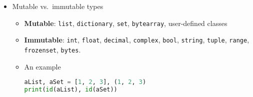 \documentclass[a4paper,12pt,%
              final%
              ]{article}
\begin{document}
\begin{itemize}
\begin{itemize}
        \begin{itemize}
          \item \verb|"Hi, {0}! It's {1}".format('Bob','Alice')| (or \verb|{<n>:s}| for instance))
          \item \verb|"Hi, {v1}! It's {v2}".format(v1='Bob',v2='Alice')| (or \verb|{<var>:s}| for instance)
          \item \verb|d={'v1':'Bob','v2':'Alice'}; "Hi, {v1}! It's {v2}".format_map(d)| equivalent to above item
        \end{itemize}
      \item \texttt{f}-strings, \verb|f'[.]'|: \verb|who='Bob'; greet=f'Hi, {who}!'| (or \verb|greet = f'Hi, {who:s}!'|)
        \begin{itemize}
          \item \verb|v1='Bob'; v2='Alice'; greet="Hi, {v1}! It's {v2}"|
          \item Braces need to be escaped: e.g.\ \verb|fr'{3}'| gives \verb|3|,  \verb|fr'{{3}}'| gives \verb|{3}|. Moreover, with variables:
\begin{lstlisting}[language=python]
test = "TEST"
print(f"That's a {test}")
# That's a TEST
print(f"That's a {{test}}")
# That's a {test}
print(f"That's a {{{test}}}") # 2 for escaping, 1 for variable
# That's a {TEST}
\end{lstlisting}
        \end{itemize}
      \item Raw-strings: identified by \texttt{r}, the backslash is interpreted as backslash (automatically escaped). For instance, \verb|'\n'| leads to a newline, \verb|r'\n'| leads to \verb|\n|.
      \item Combine \texttt{f}- and \texttt{r}-strings: just use \verb|fr'...'|
    \end{itemize}
  \item Mutable vs.\ immutable types
    \begin{itemize}
      \item \textbf{Mutable}: \texttt{list}, \texttt{dictionary}, \texttt{set}, \texttt{bytearray}, user-defined classes
      \item \textbf{Immutable}: \texttt{int}, \texttt{float}, \texttt{decimal}, \texttt{complex}, \texttt{bool}, \texttt{string}, \texttt{tuple}, \texttt{range}, \texttt{frozenset}, \texttt{bytes}.
      \item An example
\begin{lstlisting}[language=python]
aList, aSet = [1, 2, 3], (1, 2, 3)
print(id(aList), id(aSet))

\end{lstlisting}
\end{itemize}
\end{itemize}
\end{document}

